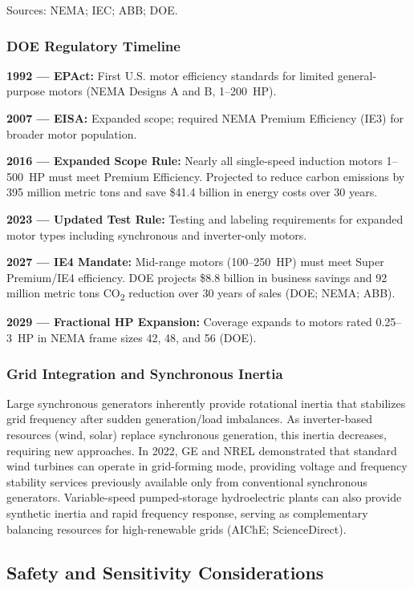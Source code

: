 \documentclass[11pt,letterpaper]{article}
\begin{document}
{\small Sources: NEMA; IEC; ABB; DOE.}

\subsubsection{DOE Regulatory Timeline}

\textbf{1992 --- EPAct:} First U.S. motor efficiency standards for limited general-purpose motors (NEMA Designs A and B, 1--200~HP). 

\textbf{2007 --- EISA:} Expanded scope; required NEMA Premium Efficiency (IE3) for broader motor population.

\textbf{2016 --- Expanded Scope Rule:} Nearly all single-speed induction motors 1--500~HP must meet Premium Efficiency. Projected to reduce carbon emissions by 395 million metric tons and save \$41.4 billion in energy costs over 30 years.

\textbf{2023 --- Updated Test Rule:} Testing and labeling requirements for expanded motor types including synchronous and inverter-only motors.

\textbf{2027 --- IE4 Mandate:} Mid-range motors (100--250~HP) must meet Super Premium/IE4 efficiency. DOE projects \$8.8 billion in business savings and 92 million metric tons CO\textsubscript{2} reduction over 30 years of sales (DOE; NEMA; ABB).

\textbf{2029 --- Fractional HP Expansion:} Coverage expands to motors rated 0.25--3~HP in NEMA frame sizes 42, 48, and 56 (DOE).

\subsubsection{Grid Integration and Synchronous Inertia}

Large synchronous generators inherently provide rotational inertia that stabilizes grid frequency after sudden generation/load imbalances. As inverter-based resources (wind, solar) replace synchronous generation, this inertia decreases, requiring new approaches. In 2022, GE and NREL demonstrated that standard wind turbines can operate in grid-forming mode, providing voltage and frequency stability services previously available only from conventional synchronous generators. Variable-speed pumped-storage hydroelectric plants can also provide synthetic inertia and rapid frequency response, serving as complementary balancing resources for high-renewable grids (AIChE; ScienceDirect).

\subsection{Safety and Sensitivity Considerations}
\end{document}
